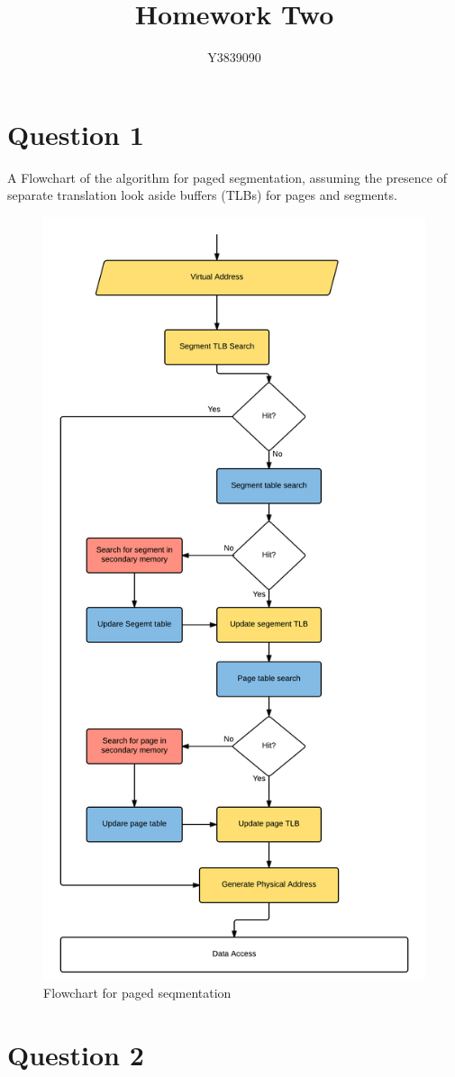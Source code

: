 \documentclass[12pt]{article}
\title{Homework Two}
\author{Y3839090}
\begin{document}
  \maketitle

  \tableofcontents %
  \listoffigures %
  \newpage

  \section{Question 1}
    A Flowchart of the algorithm for paged segmentation, assuming the presence of separate translation look aside buffers (TLBs) for pages and segments.
    \begin{figure}[ht]
      \centering
      \includegraphics[height=1\textwidth]{Paged_Segmentation_Flowchart.png}
      \caption{Flowchart for paged seqmentation}
    \end{figure}

  \newpage
  \section{Question 2}
  
\end{document}

